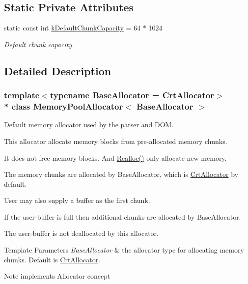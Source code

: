 \subsection*{Static Private Attributes}
\begin{DoxyCompactItemize}
\item 
static const int \hyperlink{class_memory_pool_allocator_aa6db3ea4fb9c40174d77b3fe9b1cccf1}{k\+Default\+Chunk\+Capacity} = 64 $\ast$ 1024\hypertarget{class_memory_pool_allocator_aa6db3ea4fb9c40174d77b3fe9b1cccf1}{}\label{class_memory_pool_allocator_aa6db3ea4fb9c40174d77b3fe9b1cccf1}

\begin{DoxyCompactList}\small\item\em Default chunk capacity. \end{DoxyCompactList}\end{DoxyCompactItemize}


\subsection{Detailed Description}
\subsubsection*{template$<$typename Base\+Allocator = Crt\+Allocator$>$\\*
class Memory\+Pool\+Allocator$<$ Base\+Allocator $>$}

Default memory allocator used by the parser and D\+OM. 

This allocator allocate memory blocks from pre-\/allocated memory chunks.

It does not free memory blocks. And \hyperlink{class_memory_pool_allocator_aba75280d42184b0ad414243f7f5ac6c7}{Realloc()} only allocate new memory.

The memory chunks are allocated by Base\+Allocator, which is \hyperlink{class_crt_allocator}{Crt\+Allocator} by default.

User may also supply a buffer as the first chunk.

If the user-\/buffer is full then additional chunks are allocated by Base\+Allocator.

The user-\/buffer is not deallocated by this allocator.


\begin{DoxyTemplParams}{Template Parameters}
{\em Base\+Allocator} & the allocator type for allocating memory chunks. Default is \hyperlink{class_crt_allocator}{Crt\+Allocator}. \\
\hline
\end{DoxyTemplParams}
\begin{DoxyNote}{Note}
implements Allocator concept 
\end{DoxyNote}


